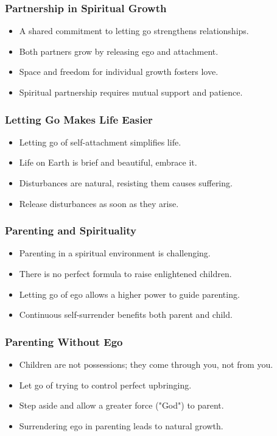 \begin{frame}[fragile]\frametitle{Partnership in Spiritual Growth}
  \begin{itemize}
    \item A shared commitment to letting go strengthens relationships.
    \item Both partners grow by releasing ego and attachment.
    \item Space and freedom for individual growth fosters love.
    \item Spiritual partnership requires mutual support and patience.
  \end{itemize}
\end{frame}

\begin{frame}[fragile]\frametitle{Letting Go Makes Life Easier}
  \begin{itemize}
    \item Letting go of self-attachment simplifies life.
    \item Life on Earth is brief and beautiful, embrace it.
    \item Disturbances are natural, resisting them causes suffering.
    \item Release disturbances as soon as they arise.
  \end{itemize}
\end{frame}

\begin{frame}[fragile]\frametitle{Parenting and Spirituality}
  \begin{itemize}
    \item Parenting in a spiritual environment is challenging.
    \item There is no perfect formula to raise enlightened children.
    \item Letting go of ego allows a higher power to guide parenting.
    \item Continuous self-surrender benefits both parent and child.
  \end{itemize}
\end{frame}

\begin{frame}[fragile]\frametitle{Parenting Without Ego}
  \begin{itemize}
    \item Children are not possessions; they come through you, not from you.
    \item Let go of trying to control perfect upbringing.
    \item Step aside and allow a greater force ("God") to parent.
    \item Surrendering ego in parenting leads to natural growth.
  \end{itemize}
\end{frame}

